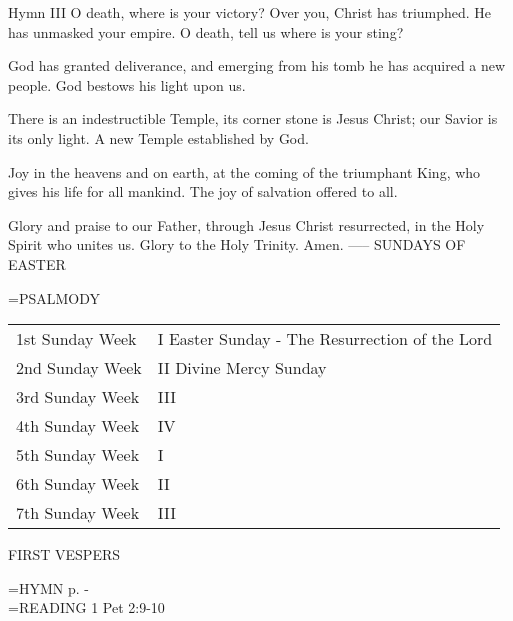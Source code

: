 Hymn III
O death, where is your victory?
Over you, Christ has triumphed.
He has unmasked your empire.
O death, tell us where is your sting?

God has granted deliverance, 
and emerging from his tomb
he has acquired a new people.
God bestows his light upon us.

There is an indestructible Temple,
its corner stone is Jesus Christ;
our Savior is its only light.
A new Temple established by God.

Joy in the heavens and on earth,
at the coming of the triumphant King,
who gives his life for all mankind.
The joy of salvation offered to all.

Glory and praise to our Father,
through Jesus Christ resurrected,
in the Holy Spirit who unites us.
Glory to the Holy Trinity. Amen.
-----
SUNDAYS OF EASTER

\hangindent=\parindent \small{PSALMODY}
\begin{center}
\begin{tabular}{ l l }
1st Sunday		Week &  I	Easter Sunday - The Resurrection of the Lord\\
2nd Sunday		Week &  II	Divine Mercy Sunday\\
3rd Sunday		Week &  III\\
4th Sunday		Week &  IV\\
5th Sunday		Week &  I\\
6th Sunday		Week &  II\\
7th Sunday		Week &  III\\
\end{tabular}
\end{center}		

\begin{flushleft}\normalsize FIRST VESPERS\\\end{flushleft}
\hangindent=\parindent \small{\uppercase{HYMN} p. \pageref{easter:firstHymn}-\pageref{easter:lastHymn}\\}
\hangindent=\parindent \small{\uppercase{READING}}    1 Pet 2:9-10 \textbf{   \\}

